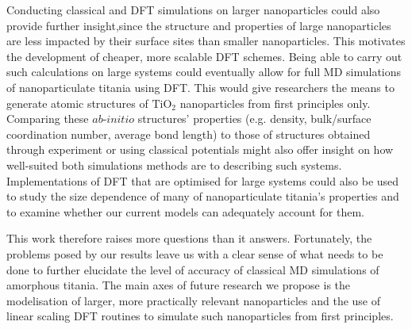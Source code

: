 \documentclass[aps,prb,twocolumn,amsmath,amssymb,superscriptaddress,longbibliography]{revtex4-1}
\newcommand\tab[1][1cm]{\hspace*{#1}} %
\begin{document}
\tab Conducting classical and DFT simulations on larger nanoparticles could also provide further insight,since the structure and properties of large nanoparticles are less impacted by their surface sites than smaller nanoparticles\cite{realistic_nnp}.
This motivates the development of cheaper, more scalable DFT schemes.  
Being able to carry out such calculations on large systems could eventually allow for full MD simulations of nanoparticulate titania using DFT.
This would give researchers the means to generate atomic structures of $\text{TiO}_2$ nanoparticles from first principles only. 
Comparing these $\textit{ab-initio}$ structures' properties (e.g. density, bulk/surface coordination number, average bond length) to those of structures obtained through experiment or using classical potentials might also offer insight on how well-suited both simulations methods are to describing such systems.
Implementations of DFT that are optimised for large systems could also be used to study the size dependence of many of nanoparticulate titania's properties and to examine whether our current models can adequately account for them. 

\tab This work therefore raises more questions than it answers.
Fortunately, the problems posed by our results leave us with a clear sense of what needs to be done to further elucidate the level of accuracy of classical MD simulations of amorphous titania.
The main axes of future research we propose is the modelisation of larger, more practically relevant nanoparticles and the use of linear scaling DFT routines to simulate such nanoparticles from first principles.
\end{document}
